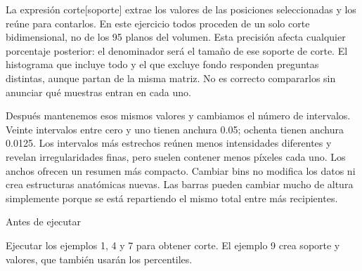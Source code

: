 La expresión corte[soporte] extrae los valores de las posiciones seleccionadas y los reúne para contarlos. En este ejercicio todos proceden de un solo corte bidimensional, no de los 95 planos del volumen. Esta precisión afecta cualquier porcentaje posterior: el denominador será el tamaño de ese soporte de corte. El histograma que incluye todo y el que excluye fondo responden preguntas distintas, aunque partan de la misma matriz. No es correcto compararlos sin anunciar qué muestras entran en cada uno.


Después mantenemos esos mismos valores y cambiamos el número de intervalos. Veinte intervalos entre cero y uno tienen anchura 0.05; ochenta tienen anchura 0.0125. Los intervalos más estrechos reúnen menos intensidades diferentes y revelan irregularidades finas, pero suelen contener menos píxeles cada uno. Los anchos ofrecen un resumen más compacto. Cambiar bins no modifica los datos ni crea estructuras anatómicas nuevas. Las barras pueden cambiar mucho de altura simplemente porque se está repartiendo el mismo total entre más recipientes.



\begin{Idea}{Antes de ejecutar}

Ejecutar los ejemplos 1, 4 y 7 para obtener corte. El ejemplo 9 crea soporte y valores, que también usarán los percentiles.


\end{Idea}



